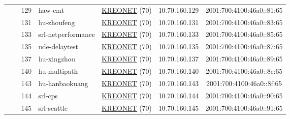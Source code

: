 \begin{small}
\begin{center}
\begin{longtable}{|c|c|c|c|c|c|c|c|}
  &  & \tiny{129} & \multicolumn{1}{|l|}{\tiny{haw-cmt}} & \multicolumn{2}{|c|}{\tiny{\href{http://www.kreonet.net}{KREONET} (70)}} & \tiny{10.70.160.129} & \tiny{2001:700:4100:46a0::81:65} \\* \cline{3-3}\cline{4-4}\cline{5-5}\cline{6-6}\cline{7-7}\cline{8-8}
  &  & \tiny{131} & \multicolumn{1}{|l|}{\tiny{hu-zhoufeng}} & \multicolumn{2}{|c|}{\tiny{\href{http://www.kreonet.net}{KREONET} (70)}} & \tiny{10.70.160.131} & \tiny{2001:700:4100:46a0::83:65} \\* \cline{3-3}\cline{4-4}\cline{5-5}\cline{6-6}\cline{7-7}\cline{8-8}
  &  & \tiny{133} & \multicolumn{1}{|l|}{\tiny{srl-netperformance}} & \multicolumn{2}{|c|}{\tiny{\href{http://www.kreonet.net}{KREONET} (70)}} & \tiny{10.70.160.133} & \tiny{2001:700:4100:46a0::85:65} \\* \cline{3-3}\cline{4-4}\cline{5-5}\cline{6-6}\cline{7-7}\cline{8-8}
  &  & \tiny{135} & \multicolumn{1}{|l|}{\tiny{ude-delaytest}} & \multicolumn{2}{|c|}{\tiny{\href{http://www.kreonet.net}{KREONET} (70)}} & \tiny{10.70.160.135} & \tiny{2001:700:4100:46a0::87:65} \\* \cline{3-3}\cline{4-4}\cline{5-5}\cline{6-6}\cline{7-7}\cline{8-8}
  &  & \tiny{137} & \multicolumn{1}{|l|}{\tiny{hu-xingzhou}} & \multicolumn{2}{|c|}{\tiny{\href{http://www.kreonet.net}{KREONET} (70)}} & \tiny{10.70.160.137} & \tiny{2001:700:4100:46a0::89:65} \\* \cline{3-3}\cline{4-4}\cline{5-5}\cline{6-6}\cline{7-7}\cline{8-8}
  &  & \tiny{140} & \multicolumn{1}{|l|}{\tiny{hu-multipath}} & \multicolumn{2}{|c|}{\tiny{\href{http://www.kreonet.net}{KREONET} (70)}} & \tiny{10.70.160.140} & \tiny{2001:700:4100:46a0::8c:65} \\* \cline{3-3}\cline{4-4}\cline{5-5}\cline{6-6}\cline{7-7}\cline{8-8}
  &  & \tiny{143} & \multicolumn{1}{|l|}{\tiny{hu-hanbaokuang}} & \multicolumn{2}{|c|}{\tiny{\href{http://www.kreonet.net}{KREONET} (70)}} & \tiny{10.70.160.143} & \tiny{2001:700:4100:46a0::8f:65} \\* \cline{3-3}\cline{4-4}\cline{5-5}\cline{6-6}\cline{7-7}\cline{8-8}
  &  & \tiny{144} & \multicolumn{1}{|l|}{\tiny{srl-cps}} & \multicolumn{2}{|c|}{\tiny{\href{http://www.kreonet.net}{KREONET} (70)}} & \tiny{10.70.160.144} & \tiny{2001:700:4100:46a0::90:65} \\* \cline{3-3}\cline{4-4}\cline{5-5}\cline{6-6}\cline{7-7}\cline{8-8}
  &  & \tiny{145} & \multicolumn{1}{|l|}{\tiny{srl-seattle}} & \multicolumn{2}{|c|}{\tiny{\href{http://www.kreonet.net}{KREONET} (70)}} & \tiny{10.70.160.145} & \tiny{2001:700:4100:46a0::91:65} \\* \cline{3-3}\cline{4-4}\cline{5-5}\cline{6-6}\cline{7-7}\cline{8-8}

\end{longtable}
\end{center}
\end{small}
